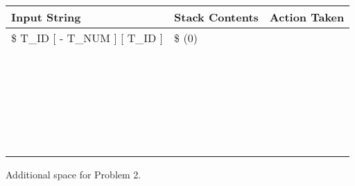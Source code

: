 \begin{tabular}{|p{5cm}|p{8cm}|p{2cm}|}
\hline
{\bf Input String} & {\bf Stack Contents} & {\bf Action Taken} \\
\hline
\$ T\_ID [ - T\_NUM ] [ T\_ID ] & \$ (0)   &  \\
\hline
   &    &  \\
\hline
   &    &  \\
\hline
   &    &  \\
\hline
   &    &  \\
\hline
   &    &  \\
\hline
   &    &  \\
\hline
   &    &  \\
\hline
   &    &  \\
\hline
   &    &  \\
\hline
   &    &  \\
\hline
   &    &  \\
\hline
   &    &  \\
\hline
   &    &  \\
\hline
   &    &  \\
\hline
   &    &  \\
\hline
   &    &  \\
\hline
   &    &  \\
\hline
   &    &  \\
\hline
   &    &  \\
\hline
   &    &  \\
\hline
   &    &  \\
\hline
   &    &  \\
\hline
   &    &  \\
\hline
   &    &  \\
\hline
   &    &  \\
\hline
   &    &  \\
\hline
\end{tabular}

\pagebreak

Additional space for Problem 2.


